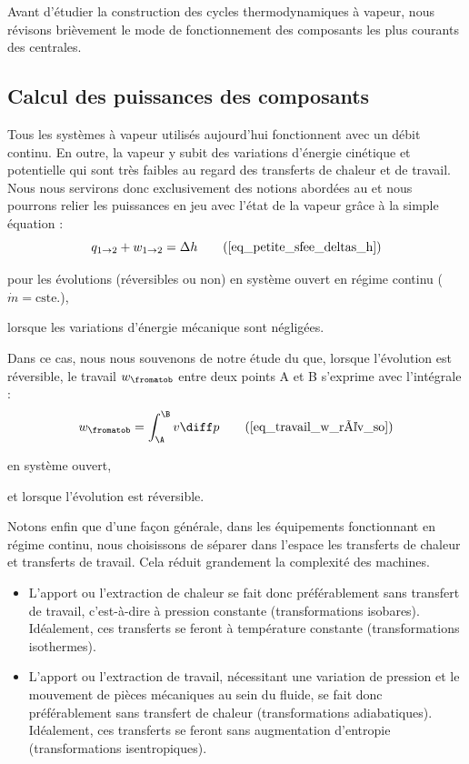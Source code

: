 	Avant d’étudier la construction des cycles thermodynamiques à vapeur, nous révisons brièvement le mode de fonctionnement des composants les plus courants des centrales.

	\subsection{Calcul des puissances des composants}
	\label{ch_expressions_puissances_vapeur}

		Tous les systèmes à vapeur utilisés aujourd’hui fonctionnent avec un débit continu. En outre, la vapeur y subit des variations d’énergie cinétique et potentielle qui sont très faibles au regard des transferts de chaleur et de travail. Nous nous servirons donc exclusivement des notions abordées au \courstrois et nous pourrons relier les puissances en jeu avec l’état de la vapeur grâce à la simple équation :
		\begin{equation}
				q_{1 \to 2} + w_{1 \to 2} = \Delta h 	\tag{\ref{eq_petite_sfee_deltas_h}}
		\end{equation}
		\begin{equationterms}
			\item pour les évolutions (réversibles ou non) en système ouvert en régime continu ($\dot m = \text{cste.}$),
			\item lorsque les variations d’énergie mécanique sont négligées.
		\end{equationterms}

		Dans ce cas, nous nous souvenons de notre étude du \courstroisshort que, lorsque l’évolution est réversible, le travail $w_\fromatob$ entre deux points A et B s’exprime avec l’intégrale :
		\begin{equation}
				w_\fromatob =  \int_\A^\B v \diff p 		\tag{\ref{eq_travail_w_rév_so}}
		\end{equation}
		\begin{equationterms}
			\item en système ouvert,
			\item et lorsque l’évolution est réversible.
		\end{equationterms}

		Notons enfin que d’une façon générale, dans les équipements fonctionnant en régime continu, nous choisissons de séparer dans l’espace les transferts de chaleur et transferts de travail. Cela réduit grandement la complexité des machines.

		\begin{itemize}
			\item L’apport ou l’extraction de chaleur se fait donc préférablement sans transfert de travail, c’est-à-dire à pression constante (transformations isobares). Idéalement, ces transferts se feront à température constante (transformations isothermes).
			\item L’apport ou l’extraction de travail, nécessitant une variation de pression et le mouvement de pièces mécaniques au sein du fluide, se fait donc préférablement sans transfert de chaleur (transformations adiabatiques). Idéalement, ces transferts se feront sans augmentation d’entropie (transformations isentropiques).
		\end{itemize}



